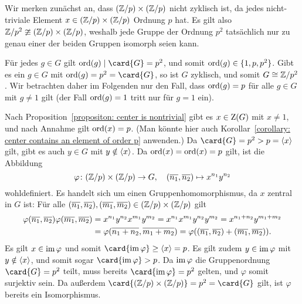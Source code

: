 \subsection{}

Wir merken zunächst an, dass $(\mathbb{Z}/p) \times (\mathbb{Z}/p)$ nicht zyklisch ist, da jedes nicht-triviale Element $x \in (\mathbb{Z}/p) \times (\mathbb{Z}/p)$ Ordnung $p$ hat.
Es gilt also $\mathbb{Z}/p^2 \ncong (\mathbb{Z}/p) \times (\mathbb{Z}/p)$, weshalb jede Gruppe der Ordnung $p^2$ tatsächlich nur zu genau einer der beiden Gruppen isomorph seien kann.

Für jedes $g \in G$ gilt $\ord{g} \divides \card{G} = p^2$, und somit $\operatorname{ord}(g) \in \{1, p, p^2\}$.
Gibt es ein $g \in G$ mit $\ord{g} = p^2 = \card{G}$, so ist $G$ zyklisch, und somit $G \cong \mathbb{Z}/p^2$.
Wir betrachten daher im Folgenden nur den Fall, dass $\operatorname{ord}(g) = p$ für alle $g \in G$ mit $g \neq 1$ gilt (der Fall $\operatorname{ord}(g) = 1$ tritt nur für $g = 1$ ein).

Nach Proposition~\ref{propositon: center is nontrivial} gibt es $x \in \operatorname{Z}(G)$ mit $x \neq 1$, und nach Annahme gilt $\operatorname{ord}(x) = p$.
(Man könnte hier auch Korollar~\ref{corollary: center contains an element of order p} anwenden.)
Da $\card{G} = p^2 > p = \generated{x}$ gilt, gibt es auch $y \in G$ mit $y \notin \langle x\rangle$.
Da $\operatorname{ord}(x) = \operatorname{ord}(x) = p$ gilt, ist die Abbildung
\[
          \varphi
  \colon  (\mathbb{Z}/p) \times (\mathbb{Z}/p)
  \to     G,
  \quad   (\overline{n_1}, \overline{n_2})
  \mapsto x^{n_1} y^{n_2}
\]
wohldefiniert.
Es handelt sich um einen Gruppenhomomorphismus, da $x$ zentral in $G$ ist:
Für alle $(\overline{n_1}, \overline{n_2}), (\overline{m_1}, \overline{m_2}) \in (\mathbb{Z}/p) \times (\mathbb{Z}/p)$ gilt
\begin{align*}
      \varphi(\overline{n_1}, \overline{n_2}) \varphi(\overline{m_1}, \overline{m_2})
  &=  x^{n_1} y^{n_2} x^{m_1} y^{m_2}
   =  x^{n_1} x^{m_1} y^{n_2} y^{m_2}
   =  x^{n_1 + n_2} y^{m_1 + m_2}
  \\
  &=  \varphi(\overline{n_1 + n_2}, \overline{m_1 + m_2})
   =  \varphi( (\overline{n_1}, \overline{n_2}) + (\overline{m_1}, \overline{m_2}) ).
\end{align*}
Es gilt $x \in \operatorname{im} \varphi$ und somit $\card{\im \varphi} \geq \generated{x} = p$.
Es gilt zudem $y \in \operatorname{im} \varphi$ mit $y \notin \langle x\rangle$, und somit sogar $\card{\im \varphi} > p$.
Da $\operatorname{im} \varphi$ die Gruppenordnung $\card{G} = p^2$ teilt, muss bereits $\card{\im \varphi} = p^2$ gelten, und $\varphi$ somit surjektiv sein.
Da außerdem $\card{(\Integer/p) \times (\Integer/p)} = p^2 = \card{G}$ gilt, ist $\varphi$ bereits ein Isomorphismus.

